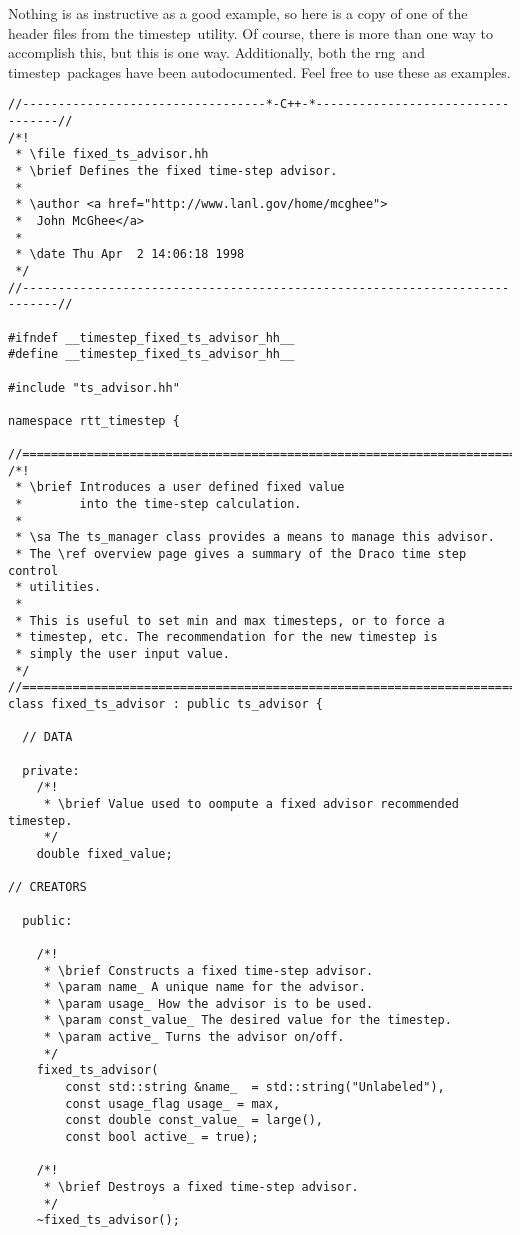\documentclass[11pt]{nmemo}
\newcommand{\rng}{{\normalfont\sffamily rng}}
\newcommand{\timestep}{{\normalfont\sffamily timestep}}
\begin{document}
Nothing is as instructive as a good example, so here is a copy of
one of the header files from the \timestep\ utility. Of course,
there is more than one way to accomplish this, but this is one way.
Additionally, both the \rng\ and \timestep\ packages have been
autodocumented.  Feel free to use these as examples.

\begin{verbatim}
//----------------------------------*-C++-*----------------------------------//
/*! 
 * \file fixed_ts_advisor.hh
 * \brief Defines the fixed time-step advisor.
 *
 * \author <a href="http://www.lanl.gov/home/mcghee">
 *  John McGhee</a>
 *
 * \date Thu Apr  2 14:06:18 1998
 */
//---------------------------------------------------------------------------//

#ifndef __timestep_fixed_ts_advisor_hh__
#define __timestep_fixed_ts_advisor_hh__

#include "ts_advisor.hh"

namespace rtt_timestep {

//===========================================================================//
/*!
 * \brief Introduces a user defined fixed value 
 *        into the time-step calculation.
 *
 * \sa The ts_manager class provides a means to manage this advisor.
 * The \ref overview page gives a summary of the Draco time step control
 * utilities. 
 *
 * This is useful to set min and max timesteps, or to force a
 * timestep, etc. The recommendation for the new timestep is
 * simply the user input value. 
 */ 
//===========================================================================//
class fixed_ts_advisor : public ts_advisor {

  // DATA

  private:
    /*!
     * \brief Value used to oompute a fixed advisor recommended timestep.
     */
    double fixed_value; 
   
// CREATORS

  public:

    /*!
     * \brief Constructs a fixed time-step advisor.
     * \param name_ A unique name for the advisor.
     * \param usage_ How the advisor is to be used.
     * \param const_value_ The desired value for the timestep.
     * \param active_ Turns the advisor on/off.
     */
    fixed_ts_advisor( 
        const std::string &name_  = std::string("Unlabeled"),
        const usage_flag usage_ = max, 
        const double const_value_ = large(),
        const bool active_ = true);

    /*!
     * \brief Destroys a fixed time-step advisor.
     */
    ~fixed_ts_advisor();


\end{verbatim}
\end{document}

